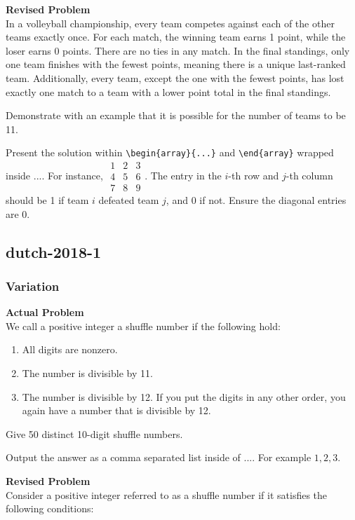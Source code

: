 \textbf{Revised Problem}\\
In a volleyball championship, every team competes against each of the other teams exactly once. For each match, the winning team earns 1 point, while the loser earns 0 points. There are no ties in any match. In the final standings, only one team finishes with the fewest points, meaning there is a unique last-ranked team. Additionally, every team, except the one with the fewest points, has lost exactly one match to a team with a lower point total in the final standings.

Demonstrate with an example that it is possible for the number of teams to be 11.

Present the solution within \verb|\begin{array}{...}| and \verb|\end{array}| wrapped inside $\boxed{...}$. For instance, $\boxed{\begin{array}{ccc}1 & 2 & 3 \\ 4 & 5 & 6 \\ 7 & 8 & 9\end{array}}$.
The entry in the $i$-th row and $j$-th column should be 1 if team $i$ defeated team $j$, and 0 if not. Ensure the diagonal entries are 0.

\subsection{dutch-2018-1}
\subsubsection{Variation}
\textbf{Actual Problem}\\
We call a positive integer a shuffle number if the following hold:

\begin{enumerate}
\item All digits are nonzero.
\item The number is divisible by 11.
\item The number is divisible by 12. If you put the digits in any other order, you again have a number that is divisible by 12.
\end{enumerate}
Give 50 distinct 10-digit shuffle numbers.

Output the answer as a comma separated list inside of $\boxed{...}$. For example $\boxed{1, 2, 3}$.

\textbf{Revised Problem}\\
Consider a positive integer referred to as a shuffle number if it satisfies the following conditions:

